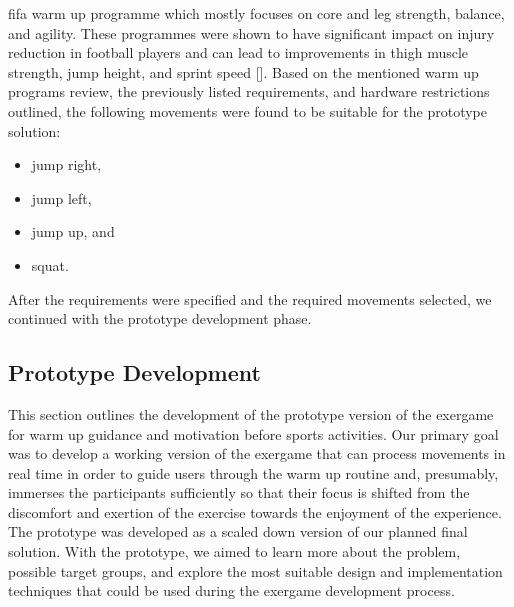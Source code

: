 \gls{fifa} \cite{fifa} warm up programme which mostly focuses on core and leg strength, balance, and agility. These programmes were shown to have significant impact on injury reduction in football players and can lead to improvements in thigh muscle strength, jump height, and sprint speed []. %
Based on the mentioned warm up programs review, the previously listed requirements, and hardware restrictions outlined, the following movements were found to be suitable for the prototype solution: 
\begin{itemize}
\item jump right,
\item jump left,
\item jump up, and
\item squat.
\end{itemize}
After the requirements were specified and the required movements selected, we continued with the prototype development phase.
\subsection{Prototype Development}
This section outlines the development of the prototype version of the exergame for warm up guidance and motivation before sports activities. Our primary goal was to develop a working version of the exergame that can process movements in real time in order to guide users through the warm up routine and, presumably, immerses the participants sufficiently so that their focus is shifted from the discomfort and exertion of the exercise towards the enjoyment of the experience. The prototype was developed as a scaled down version of our planned final solution. With the prototype, we aimed to learn more about the problem, possible target groups, and explore the most suitable design and implementation techniques that could be used during the exergame development process. 
